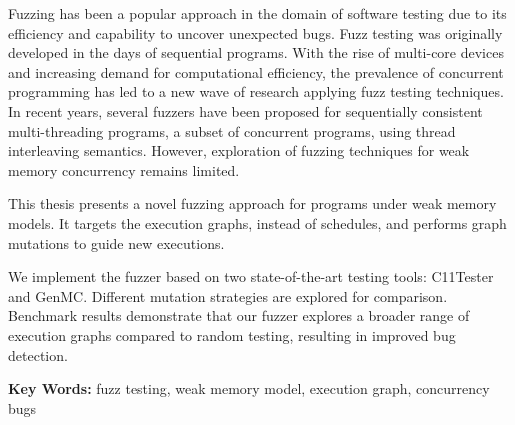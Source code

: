 
Fuzzing has been a popular approach in the domain of software testing due to its efficiency and capability to uncover  unexpected bugs. Fuzz testing was originally developed in the days of sequential programs. With the rise of multi-core devices and increasing demand for computational efficiency, the prevalence of concurrent programming has led to a new wave of research applying fuzz testing techniques. In recent years, several fuzzers have been proposed for sequentially consistent multi-threading programs, a subset of concurrent programs, using thread interleaving semantics. However, exploration of fuzzing techniques for weak memory concurrency remains limited.

This thesis presents a novel fuzzing approach for programs under weak memory models. It targets the execution graphs, instead of schedules, and performs graph mutations to guide new executions.

We implement the fuzzer based on two state-of-the-art testing tools: C11Tester and GenMC. Different mutation strategies are explored for comparison. Benchmark results demonstrate that our fuzzer explores a broader range of execution graphs compared to random testing, resulting in improved bug detection.

\textbf{Key Words:} fuzz testing, weak memory model, execution graph, concurrency bugs

